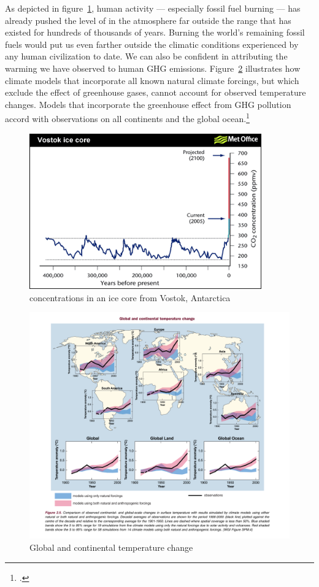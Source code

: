 As depicted in figure~\ref{fig:Vostok}, human activity --- especially fossil fuel burning --- has already pushed the level of  in the atmosphere  far outside the range that has existed for hundreds of thousands of years. Burning the world's remaining fossil fuels would put us even farther outside the climatic conditions experienced by any human civilization to date.
We can also be confident in attributing the warming we have observed to human GHG emissions.
Figure~\ref{fig:CO2increase} illustrates how climate models that incorporate all known natural climate forcings, but which exclude the effect of greenhouse gases, cannot account for observed temperature changes. 
Models that incorporate the greenhouse effect from GHG pollution accord with observations on all continents and the global ocean.\footcite[][]{IPCC2007}



\begin{figure}
\includegraphics[width=100mm]{s2-co2increase.png}
\centering
\caption{ concentrations in an ice core from Vostok, Antarctica}
\label{fig:Vostok}
\end{figure}



\begin{figure}
\includegraphics[width=160mm]{s2-attribution.PNG}
\centering
\caption{Global and continental temperature change}
\label{fig:CO2increase}
\end{figure}



